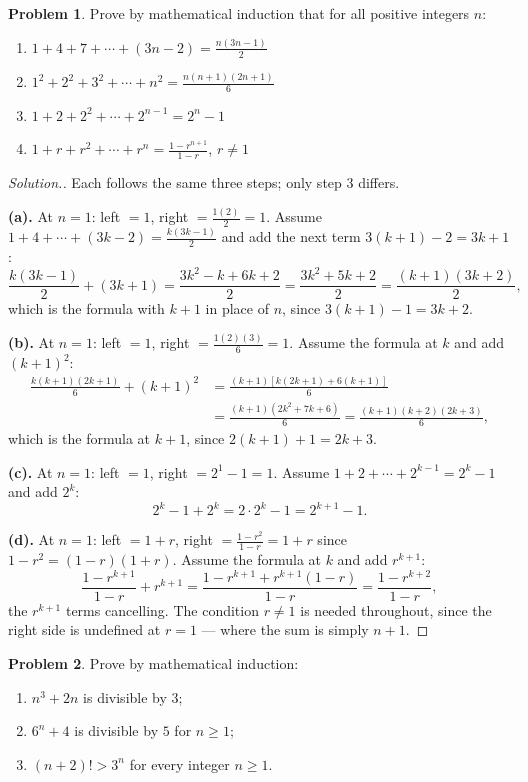 \documentclass[11pt,a4paper]{article}
\theoremstyle{definition}
\newtheorem{problemx}{Problem}[section]
\newenvironment{problem}{\begin{problemx}}{\end{problemx}}
\newenvironment{solution}
  {\renewcommand{\qedsymbol}{}\begin{proof}[\textit{Solution}.]}
  {\end{proof}}
\begin{document}
\begin{problem}
Prove by mathematical induction that for all positive integers $n$:
\begin{enumerate}
\item[(a).] $1+4+7+\cdots +(3n-2)=\frac{n(3n-1)}{2}$
\item[(b).] $1^2+2^2+3^2+\cdots +n^2=\frac{n(n+1)(2n+1)}{6}$
\item[(c).] $1+2+2^2+\cdots +2^{n-1}=2^n-1$
\item[(d).] $1+r+r^2+\cdots +r^n=\frac{1-r^{n+1}}{1-r}$, \quad $r\neq 1$
\end{enumerate}
\end{problem}

\begin{solution}
Each follows the same three steps; only step 3 differs.

\textbf{(a).} At $n=1$: left $=1$, right $=\frac{1(2)}{2}=1$. Assume
$1+4+\cdots+(3k-2)=\frac{k(3k-1)}{2}$ and add the next term $3(k+1)-2=3k+1$:
$$\frac{k(3k-1)}{2}+(3k+1)=\frac{3k^{2}-k+6k+2}{2}=\frac{3k^{2}+5k+2}{2}
=\frac{(k+1)(3k+2)}{2},$$
which is the formula with $k+1$ in place of $n$, since $3(k+1)-1=3k+2$.

\textbf{(b).} At $n=1$: left $=1$, right $=\frac{1(2)(3)}{6}=1$. Assume the formula
at $k$ and add $(k+1)^{2}$:
\begin{align*}
\frac{k(k+1)(2k+1)}{6}+(k+1)^{2}
&=\frac{(k+1)\left[k(2k+1)+6(k+1)\right]}{6}\\
&=\frac{(k+1)\left(2k^{2}+7k+6\right)}{6}
 =\frac{(k+1)(k+2)(2k+3)}{6},
\end{align*}
which is the formula at $k+1$, since $2(k+1)+1=2k+3$.

\textbf{(c).} At $n=1$: left $=1$, right $=2^{1}-1=1$. Assume
$1+2+\cdots+2^{k-1}=2^{k}-1$ and add $2^{k}$:
$$2^{k}-1+2^{k}=2\cdot 2^{k}-1=2^{k+1}-1 .$$

\textbf{(d).} At $n=1$: left $=1+r$, right $=\frac{1-r^{2}}{1-r}=1+r$ since
$1-r^{2}=(1-r)(1+r)$. Assume the formula at $k$ and add $r^{k+1}$:
$$\frac{1-r^{k+1}}{1-r}+r^{k+1}
=\frac{1-r^{k+1}+r^{k+1}(1-r)}{1-r}
=\frac{1-r^{k+2}}{1-r},$$
the $r^{k+1}$ terms cancelling. The condition $r\neq 1$ is needed throughout, since
the right side is undefined at $r=1$ --- where the sum is simply $n+1$.
\end{solution}

\begin{problem}
Prove by mathematical induction:
\begin{enumerate}
\item[(a).] $n^{3}+2n$ is divisible by $3$;
\item[(b).] $6^{n}+4$ is divisible by $5$ for $n\geq 1$;
\item[(c).] $(n+2)!>3^{n}$ for every integer $n\geq 1$.
\end{enumerate}
\end{problem}
\end{document}
